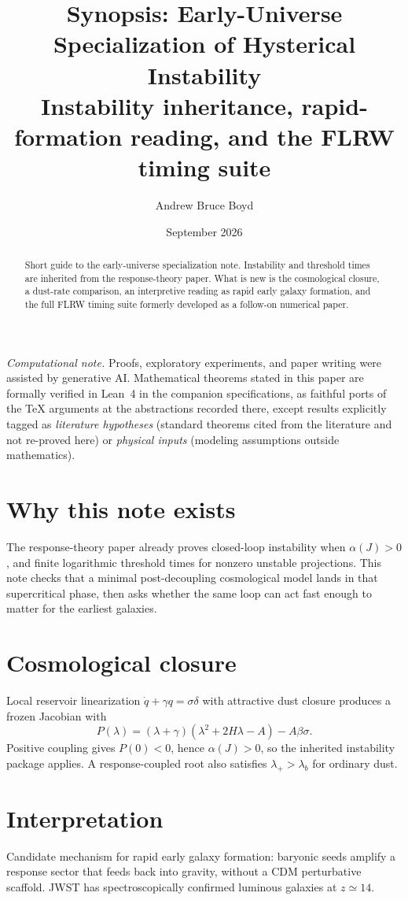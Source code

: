 \documentclass[11pt]{article}
\title{\textbf{Synopsis: Early-Universe Specialization of Hysterical Instability}\\[0.35em]
\large Instability inheritance, rapid-formation reading, and the FLRW timing suite}
\author{Andrew Bruce Boyd}
\date{September 2026}
\theoremstyle{definition}
\theoremstyle{remark}
\begin{document}
\maketitle
\noindent\textit{Computational note.}
Proofs, exploratory experiments, and paper writing were assisted by generative AI.
Mathematical theorems stated in this paper are formally verified in Lean~4 in the
companion specifications, as faithful ports of the TeX arguments at the abstractions
recorded there, except results explicitly tagged as \emph{literature hypotheses}
(standard theorems cited from the literature and not re-proved here) or
\emph{physical inputs} (modeling assumptions outside mathematics).

\begin{abstract}
Short guide to the early-universe specialization note.
Instability and threshold times are inherited from the response-theory paper.
What is new is the cosmological closure, a dust-rate comparison, an interpretive reading as rapid early galaxy formation, and the full FLRW timing suite formerly developed as a follow-on numerical paper.
\end{abstract}

\section{Why this note exists}
The response-theory paper already proves closed-loop instability when $\alpha(J)>0$, and finite logarithmic threshold times for nonzero unstable projections.
This note checks that a minimal post-decoupling cosmological model lands in that supercritical phase, then asks whether the same loop can act fast enough to matter for the earliest galaxies.

\section{Cosmological closure}
Local reservoir linearization $\dot q+\gamma q=\sigma\delta$ with attractive dust closure produces a frozen Jacobian with
\[
P(\lambda)=(\lambda+\gamma)(\lambda^2+2H\lambda-A)-A\beta\sigma.
\]
Positive coupling gives $P(0)<0$, hence $\alpha(J)>0$, so the inherited instability package applies.
A response-coupled root also satisfies $\lambda_+>\lambda_b$ for ordinary dust.

\section{Interpretation}
Candidate mechanism for rapid early galaxy formation: baryonic seeds amplify a response sector that feeds back into gravity, without a CDM perturbative scaffold.
JWST has spectroscopically confirmed luminous galaxies at $z\simeq14$.
\end{document}
